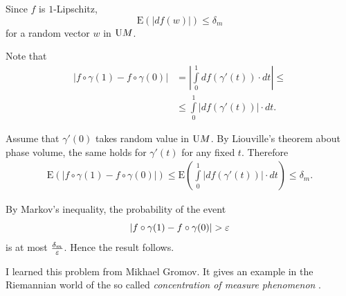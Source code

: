 Since $f$ is $1$-Lipschitz,
\[\mathrm{E}(|df(w)|)\le\delta_m\]
for a random vector $w$ in $\mathrm{U} M$.


Note that 
\begin{align*}
|f\circ \gamma(1)-f\circ\gamma(0)|
&=
\left|\int\limits_0^1df(\gamma'(t))\cdot dt\right|\le \\
&\le \int\limits_0^1\left|df(\gamma'(t))\right|\cdot dt.
\end{align*}

Assume that $\gamma'(0)$
takes random value in $\mathrm{U} M$.
By Liouville's theorem about phase volume, the same holds for $\gamma'(t)$
for any fixed $t$.
Therefore
\begin{align*}
\mathrm{E}(|f\circ \gamma(1)-f\circ\gamma(0)|)\le \mathrm{E}\left(\int\limits_0^1|df(\gamma'(t))|\cdot dt\right)\le\delta_m.
\end{align*}

By Markov's inequality,
the probability of the event 
\[|f\circ \gamma(1)-f\circ\gamma(0)|>\eps\]
is at most $\tfrac{\delta_m}{\varepsilon}$.
Hence the result follows.
\qeds

I learned this problem from Mikhael Gromov.
It gives an example in the Riemannian world
of the so called 
\emph{concentration of measure phenomenon}
\cite{milman-schechtman,ledoux}.
